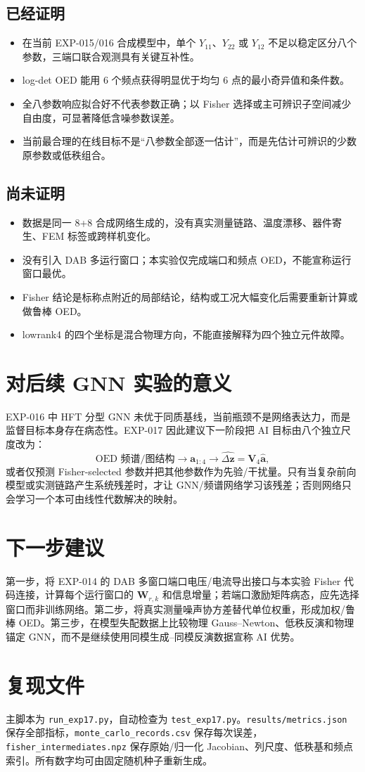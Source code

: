 \documentclass[11pt,a4paper]{ctexart}
\begin{document}
\subsection*{已经证明}
\begin{itemize}
\item 在当前 EXP-015/016 合成模型中，单个 $Y_{11}$、$Y_{22}$ 或 $Y_{12}$ 不足以稳定区分八个参数，三端口联合观测具有关键互补性。
\item log-det OED 能用 6 个频点获得明显优于均匀 6 点的最小奇异值和条件数。
\item 全八参数响应拟合好不代表参数正确；以 Fisher 选择或主可辨识子空间减少自由度，可显著降低含噪参数误差。
\item 当前最合理的在线目标不是``八参数全部逐一估计''，而是先估计可辨识的少数原参数或低秩组合。
\end{itemize}

\subsection*{尚未证明}
\begin{itemize}
\item 数据是同一 8+8 合成网络生成的，没有真实测量链路、温度漂移、器件寄生、FEM 标签或跨样机变化。
\item 没有引入 DAB 多运行窗口；本实验仅完成端口和频点 OED，不能宣称运行窗口最优。
\item Fisher 结论是标称点附近的局部结论，结构或工况大幅变化后需要重新计算或做鲁棒 OED。
\item lowrank4 的四个坐标是混合物理方向，不能直接解释为四个独立元件故障。
\end{itemize}

\enlargethispage{7\baselineskip}
\section{对后续 GNN 实验的意义}
EXP-016 中 HFT 分型 GNN 未优于同质基线，当前瓶颈不是网络表达力，而是监督目标本身存在病态性。EXP-017 因此建议下一阶段把 AI 目标由八个独立尺度改为：
\begin{equation}
\text{OED 频谱/图结构}\longrightarrow \bm a_{1:4}
\longrightarrow \widehat{\Delta\bm z}=\bm V_4\hat{\bm a},
\end{equation}
或者仅预测 Fisher-selected 参数并把其他参数作为先验/干扰量。只有当复杂前向模型或实测链路产生系统残差时，才让 GNN/频谱网络学习该残差；否则网络只会学习一个本可由线性代数解决的映射。

\section{下一步建议}
第一步，将 EXP-014 的 DAB 多窗口端口电压/电流导出接口与本实验 Fisher 代码连接，计算每个运行窗口的 $\bm W_{r,k}$ 和信息增量；若端口激励矩阵病态，应先选择窗口而非训练网络。第二步，将真实测量噪声协方差替代单位权重，形成加权/鲁棒 OED。第三步，在模型失配数据上比较物理 Gauss--Newton、低秩反演和物理锚定 GNN，而不是继续使用同模生成--同模反演数据宣称 AI 优势。

\section*{复现文件}
主脚本为 \texttt{run\_exp17.py}，自动检查为 \texttt{test\_exp17.py}。\texttt{results/metrics.json} 保存全部指标，\texttt{monte\_carlo\_records.csv} 保存每次误差，\texttt{fisher\_intermediates.npz} 保存原始/归一化 Jacobian、列尺度、低秩基和频点索引。所有数字均可由固定随机种子重新生成。
\end{document}
